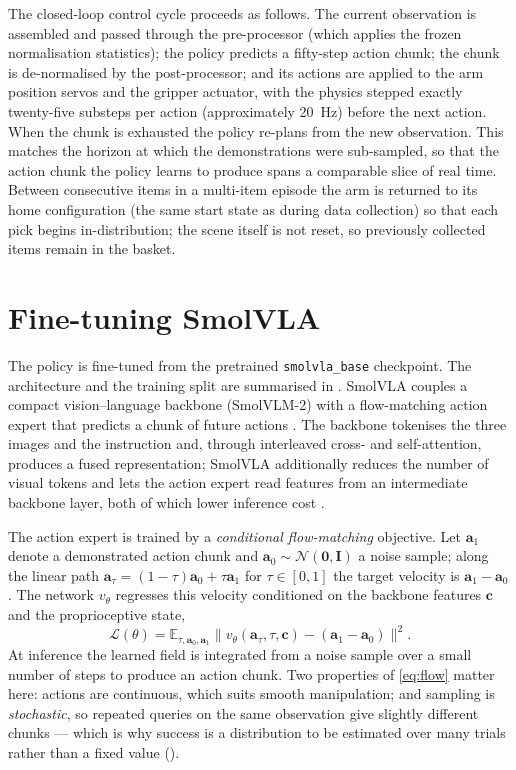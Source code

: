 The closed-loop control cycle proceeds as follows. The current observation is
assembled and passed through the pre-processor (which applies the frozen
normalisation statistics); the policy predicts a fifty-step action chunk; the chunk
is de-normalised by the post-processor; and its actions are applied to the arm
position servos and the gripper actuator, with the physics stepped exactly
twenty-five substeps per action (approximately \SI{20}{Hz}) before the next action.
When the chunk is exhausted the policy re-plans from the new observation. This
matches the horizon at which the demonstrations were sub-sampled, so that the action
chunk the policy learns to produce spans a comparable slice of real time. Between
consecutive items in a multi-item episode the arm is returned to its home
configuration (the same start state as during data collection) so that each pick
begins in-distribution; the scene itself is not reset, so previously collected items
remain in the basket.

\section{Fine-tuning SmolVLA}
\label{sec:m-train}
The policy is fine-tuned from the pretrained \texttt{smolvla\_base} checkpoint. The
architecture and the training split are summarised in .
SmolVLA couples a compact vision--language backbone (SmolVLM-2) with a
flow-matching action expert that predicts a chunk of future actions
\parencite{shukor2025smolvla, kiviranta2025smolvla}. The backbone tokenises the three
images and the instruction and, through interleaved cross- and self-attention,
produces a fused representation; SmolVLA additionally reduces the number of visual
tokens and lets the action expert read features from an intermediate backbone layer,
both of which lower inference cost \parencite{shukor2025smolvla}.

The action expert is trained by a \emph{conditional flow-matching} objective. Let
$\mathbf{a}_1$ denote a demonstrated action chunk and $\mathbf{a}_0\sim\mathcal{N}
(\mathbf{0},\mathbf{I})$ a noise sample; along the linear path
$\mathbf{a}_\tau=(1-\tau)\mathbf{a}_0+\tau\mathbf{a}_1$ for $\tau\in[0,1]$ the target
velocity is $\mathbf{a}_1-\mathbf{a}_0$. The network $v_\theta$ regresses this
velocity conditioned on the backbone features $\mathbf{c}$ and the proprioceptive
state,
\begin{equation}
\mathcal{L}(\theta)=\mathbb{E}_{\tau,\mathbf{a}_0,\mathbf{a}_1}
\big\lVert v_\theta(\mathbf{a}_\tau,\tau,\mathbf{c})-(\mathbf{a}_1-\mathbf{a}_0)\big\rVert^2 .
\label{eq:flow}
\end{equation}
At inference the learned field is integrated from a noise sample over a small number
of steps to produce an action chunk. Two properties of \eqref{eq:flow} matter here:
actions are continuous, which suits smooth manipulation; and sampling is
\emph{stochastic}, so repeated queries on the same observation give slightly
different chunks --- which is why success is a distribution to be estimated over many
trials rather than a fixed value ().

